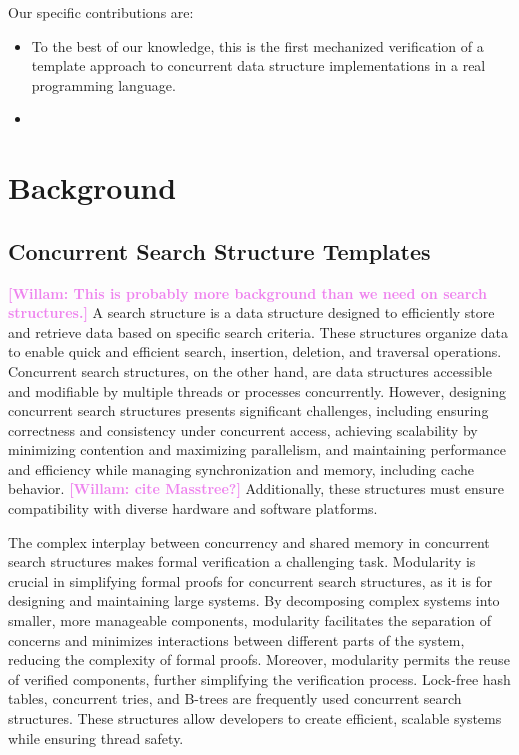 \documentclass[a4paper,UKenglish,cleveref, autoref, thm-restate]{lipics-v2021}
\newcommand{\wm}[1]{\textbf{\textcolor{violet}{[Willam: #1]}}}
\begin{document}
Our specific contributions are:
\begin{itemize}
\item To the best of our knowledge, this is the first mechanized verification of a template approach to concurrent data structure implementations in a real programming language.
\item 
\end{itemize}


\section{Background}
\subsection{Concurrent Search Structure Templates}
\wm{This is probably more background than we need on search structures.}
A search structure is a data structure designed to efficiently store and retrieve data based on specific search criteria. These structures organize data to enable quick and efficient search, insertion, deletion, and traversal operations. Concurrent search structures, on the other hand, are data structures accessible and modifiable by multiple threads or processes concurrently. However, designing concurrent search structures presents significant challenges, including ensuring correctness and consistency under concurrent access, achieving scalability by minimizing contention and maximizing parallelism, and maintaining performance and efficiency while managing synchronization and memory, including cache behavior. \wm{cite Masstree?} Additionally, these structures must ensure compatibility with diverse hardware and software platforms.

The complex interplay between concurrency and shared memory in concurrent search structures makes formal verification a challenging task. Modularity is crucial in simplifying formal proofs for concurrent search structures, as it is for designing and maintaining large systems. By decomposing complex systems into smaller, more manageable components, modularity facilitates the separation of concerns and minimizes interactions between different parts of the system, reducing the complexity of formal proofs. Moreover, modularity permits the reuse of verified components, further simplifying the verification process. Lock-free hash tables, concurrent tries, and B-trees are frequently used concurrent search structures. These structures allow developers to create efficient, scalable systems while ensuring thread safety.
\end{document}

